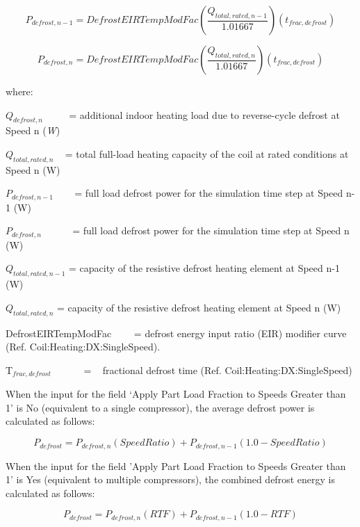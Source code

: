 \begin{equation}
{P_{defrost,n - 1}} = DefrostEIRTempModFac\left( {\frac{{{Q_{total,rated,n - 1}}}}{{1.01667}}} \right)({t_{frac,defrost}})
\end{equation}

\begin{equation}
{P_{defrost,n}} = DefrostEIRTempModFac\left( {\frac{{{Q_{total,rated,n}}}}{{1.01667}}} \right)({t_{frac,defrost}})
\end{equation}

where:

\({Q_{defrost,n}}\) ~~~~ = additional indoor heating load due to reverse-cycle defrost at Speed n (\emph{W})

\({Q_{total,rated,n}}\) ~ = total full-load heating capacity of the coil at rated conditions at Speed n (W)

\({P_{defrost,n - 1}}\) ~~~ = full load defrost power for the simulation time step at Speed n-1 (W)

\({P_{defrost,n}}\) ~~~~~ = full load defrost power for the simulation time step at Speed n (W)

\({Q_{total,rated,n - 1}}\) = capacity of the resistive defrost heating element at Speed n-1 (W)

\({Q_{total,rated,n}}\) = capacity of the resistive defrost heating element at Speed n (W)

DefrostEIRTempModFac~~~~ = defrost energy input ratio (EIR) modifier curve (Ref. Coil:Heating:DX:SingleSpeed).

T\(_{frac,defrost}\)~~~~~~ = ~ fractional defrost time (Ref. Coil:Heating:DX:SingleSpeed)

When the input for the field `Apply Part Load Fraction to Speeds Greater than 1' is No (equivalent to a single compressor), the average defrost power is calculated as follows:

\begin{equation}
{P_{defrost}} = {P_{defrost,n}}(SpeedRatio) + {P_{defrost,n - 1}}(1.0 - SpeedRatio)
\end{equation}

When the input for the field 'Apply Part Load Fraction to Speeds Greater than 1' is Yes (equivalent to multiple compressors), the combined defrost energy is calculated as follows:

\begin{equation}
{P_{defrost}} = {P_{defrost,n}}(RTF) + {P_{defrost,n - 1}}(1.0 - RTF)
\end{equation}

